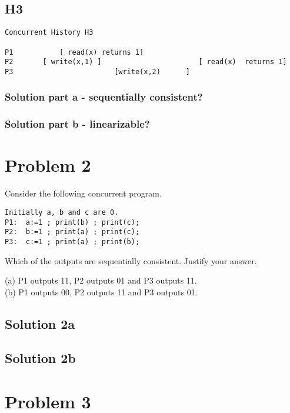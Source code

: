 \documentclass{article}
\begin{document}
\subsection{H3}
\begin{verbatim}
Concurrent History H3

P1           [ read(x) returns 1]
P2       [ write(x,1) ]                       [ read(x)  returns 1]
P3                        [write(x,2)      ]            
\end{verbatim}

\subsubsection{Solution part a - sequentially consistent?}
\subsubsection{Solution part b - linearizable?}

\pagebreak
\section{Problem 2}
Consider the following concurrent program.
\begin{verbatim}
Initially a, b and c are 0.
P1:  a:=1 ; print(b) ; print(c);
P2:  b:=1 ; print(a) ; print(c);
P3:  c:=1 ; print(a) ; print(b);
\end{verbatim}

Which of the outputs are sequentially consistent. Justify your answer.

(a) P1 outputs 11, P2 outputs 01 and P3 outputs 11.\\

(b) P1 outputs 00, P2 outputs 11 and P3 outputs 01.


\subsection{Solution 2a}


\subsection{Solution 2b}


\pagebreak
\section{Problem 3}
\end{document}
